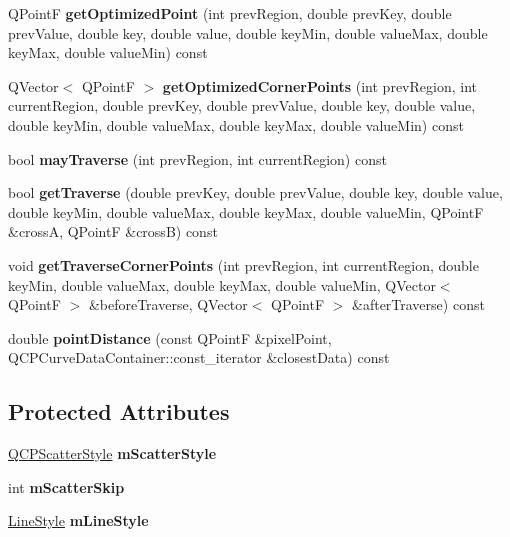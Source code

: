\begin{DoxyCompactItemize}
\item 
\mbox{\label{classQCPCurve_a1d4530a81f718a2085df03d6a059d5d8}} 
Q\+PointF {\bfseries get\+Optimized\+Point} (int prev\+Region, double prev\+Key, double prev\+Value, double key, double value, double key\+Min, double value\+Max, double key\+Max, double value\+Min) const
\item 
\mbox{\label{classQCPCurve_a66bff7933dac149c4577ad63a27da924}} 
Q\+Vector$<$ Q\+PointF $>$ {\bfseries get\+Optimized\+Corner\+Points} (int prev\+Region, int current\+Region, double prev\+Key, double prev\+Value, double key, double value, double key\+Min, double value\+Max, double key\+Max, double value\+Min) const
\item 
\mbox{\label{classQCPCurve_af5df2560b30333fe662ec676bd355415}} 
bool {\bfseries may\+Traverse} (int prev\+Region, int current\+Region) const
\item 
\mbox{\label{classQCPCurve_afc5367ef0369d7a88ebba6eacf55f14f}} 
bool {\bfseries get\+Traverse} (double prev\+Key, double prev\+Value, double key, double value, double key\+Min, double value\+Max, double key\+Max, double value\+Min, Q\+PointF \&crossA, Q\+PointF \&crossB) const
\item 
\mbox{\label{classQCPCurve_a55e24387fd97a2cad0def8a40809e9ec}} 
void {\bfseries get\+Traverse\+Corner\+Points} (int prev\+Region, int current\+Region, double key\+Min, double value\+Max, double key\+Max, double value\+Min, Q\+Vector$<$ Q\+PointF $>$ \&before\+Traverse, Q\+Vector$<$ Q\+PointF $>$ \&after\+Traverse) const
\item 
\mbox{\label{classQCPCurve_aa2c9c9c0e57f11f18a5cb7e47927157c}} 
double {\bfseries point\+Distance} (const Q\+PointF \&pixel\+Point, Q\+C\+P\+Curve\+Data\+Container\+::const\+\_\+iterator \&closest\+Data) const
\end{DoxyCompactItemize}
\subsection*{Protected Attributes}
\begin{DoxyCompactItemize}
\item 
\mbox{\label{classQCPCurve_a08f803b4a30b01bbd7a1eab15d0f864f}} 
\hyperlink{classQCPScatterStyle}{Q\+C\+P\+Scatter\+Style} {\bfseries m\+Scatter\+Style}
\item 
\mbox{\label{classQCPCurve_a990bd5fdeb474459f3f6f5ad0a7b945c}} 
int {\bfseries m\+Scatter\+Skip}
\item 
\mbox{\label{classQCPCurve_ae1f35ae2b15aee8e15bcdfec5be95156}} 
\hyperlink{classQCPCurve_a2710e9f79302152cff794c6e16cc01f1}{Line\+Style} {\bfseries m\+Line\+Style}
\end{DoxyCompactItemize}
